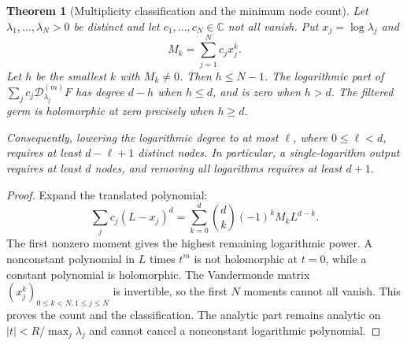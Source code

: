 \documentclass[11pt,a4paper]{article}
\numberwithin{equation}{section}
\newtheorem{theorem}{Theorem}[section]
\theoremstyle{definition}\newtheorem{definition}[theorem]{Definition}
\theoremstyle{remark}\newtheorem{remark}[theorem]{Remark}
\newcommand{\C}{\mathbb C}
\begin{document}
\begin{theorem}[Multiplicity classification and the minimum node count]
\label{rpt:thm:filtermin}
Let $\lambda_1,\ldots,\lambda_N>0$ be distinct and let $c_1,\ldots,c_N\in\C$ not all vanish. Put $x_j=\log\lambda_j$ and
\[
M_k=\sum_{j=1}^N c_jx_j^k.
\]
Let $h$ be the smallest $k$ with $M_k\ne0$. Then $h\le N-1$. The logarithmic part of $\sum_jc_j\mathcal D^{(m)}_{\lambda_j}F$ has degree $d-h$ when $h\le d$, and is zero when $h>d$. The filtered germ is holomorphic at zero precisely when $h\ge d$.

Consequently, lowering the logarithmic degree to at most $\ell$, where $0\le\ell<d$, requires at least $d-\ell+1$ distinct nodes. In particular, a single-logarithm output requires at least $d$ nodes, and removing all logarithms requires at least $d+1$.
\end{theorem}
\begin{proof}
Expand the translated polynomial:
\begin{equation}
\sum_jc_j(L-x_j)^d
=\sum_{k=0}^d\binom dk(-1)^kM_k L^{d-k}.
\label{rpt:eq:moments}
\end{equation}
The first nonzero moment gives the highest remaining logarithmic power. A nonconstant polynomial in $L$ times $t^m$ is not holomorphic at $t=0$, while a constant polynomial is holomorphic. The Vandermonde matrix $(x_j^k)_{0\le k<N,1\le j\le N}$ is invertible, so the first $N$ moments cannot all vanish. This proves the count and the classification. The analytic part remains analytic on $|t|<R/\max_j\lambda_j$ and cannot cancel a nonconstant logarithmic polynomial.
\end{proof}
\end{document}
